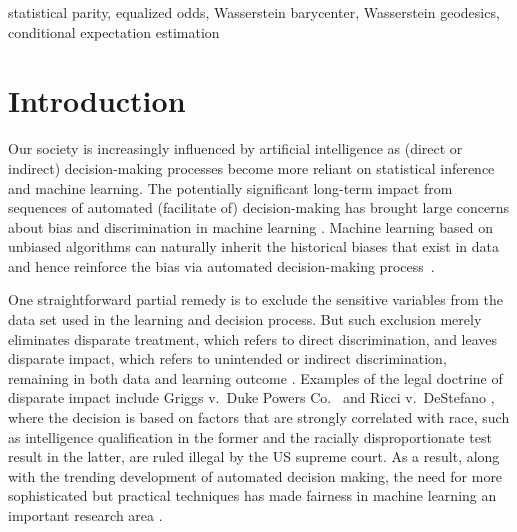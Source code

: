 \documentclass[twoside,11pt]{article}
\begin{document}
\begin{keywords}
statistical parity, equalized odds, Wasserstein barycenter, Wasserstein geodesics, %
 conditional expectation estimation
\end{keywords}

\section{Introduction}

Our society is increasingly influenced by artificial intelligence as (direct or indirect) decision-making processes become more reliant on statistical inference and machine learning. The potentially significant long-term impact from sequences of automated (facilitate of) decision-making has brought large concerns about bias and discrimination in machine learning \cite{angwin2022machine, sweeney2013discrimination}.  Machine learning based on unbiased algorithms can naturally inherit the historical biases that exist in data and hence reinforce the bias via automated decision-making process~\cite{calders2013unbiased}.

One straightforward partial remedy is to exclude the sensitive variables from the data set used in the learning and decision process. But such exclusion merely eliminates disparate treatment, which refers to direct discrimination, and leaves disparate impact, which refers to unintended or indirect discrimination, remaining in both data and learning outcome \cite{feldman2015certifying}. Examples of the legal doctrine of disparate impact include Griggs v.\ Duke Powers Co.\ \cite{blumrosen1972strangers} and Ricci v.\ DeStefano \cite{adamson2011ricci}, where the decision is based on factors that are strongly correlated with race, such as intelligence qualification in the former and the racially disproportionate test result in the latter, are ruled illegal by the US supreme court. As a result, along with the trending development of automated decision making, the need for more sophisticated but practical techniques has made fairness in machine learning an important research area \cite{executive2014big}.
\end{document}
